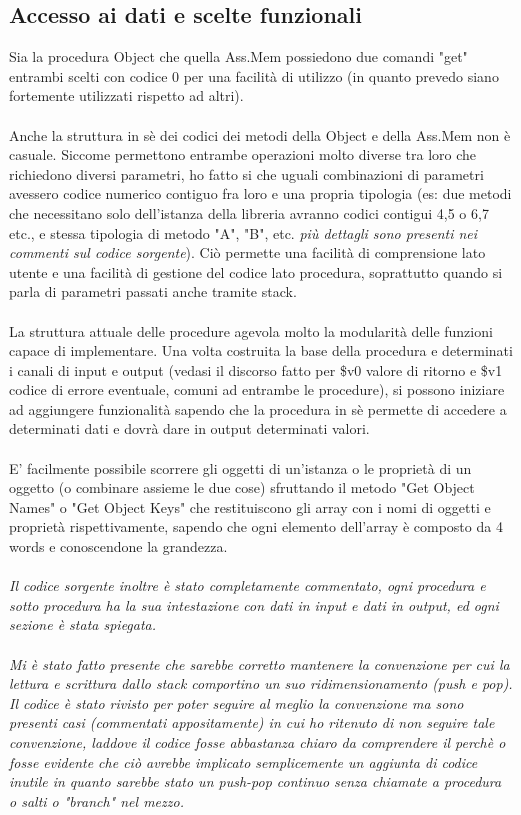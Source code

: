 \documentclass[a4paper]{article}
\begin{document}
\subsection{Accesso ai dati e scelte funzionali}
Sia la procedura Object che quella Ass.Mem possiedono due comandi "get" entrambi scelti con codice 0 per una facilità di utilizzo (in quanto prevedo siano fortemente utilizzati rispetto ad altri).
\\\\
Anche la struttura in sè dei codici dei metodi della Object e della Ass.Mem non è casuale. Siccome permettono entrambe operazioni molto diverse tra loro che richiedono diversi parametri, ho fatto si che uguali combinazioni di parametri avessero codice numerico contiguo fra loro e una propria tipologia (es: due metodi che necessitano solo dell'istanza della libreria avranno codici contigui 4,5 o 6,7 etc., e stessa tipologia di metodo "A", "B", etc. \textit{più dettagli sono presenti nei commenti sul codice sorgente}). Ciò permette una facilità di comprensione lato utente e una facilità di gestione del codice lato procedura, soprattutto quando si parla di parametri passati anche tramite stack.
\\\\
La struttura attuale delle procedure agevola molto la modularità delle funzioni capace di implementare. Una volta costruita la base della procedura e determinati i canali di input e output (vedasi il discorso fatto per \$v0 valore di ritorno e \$v1 codice di errore eventuale, comuni ad entrambe le procedure), si possono iniziare ad aggiungere funzionalità sapendo che la procedura in sè permette di accedere a determinati dati e dovrà dare in output determinati valori.
\\\\
E' facilmente possibile scorrere gli oggetti di un'istanza o le proprietà di un oggetto (o combinare assieme le due cose) sfruttando il metodo "Get Object Names" o "Get Object Keys" che restituiscono gli array con i nomi di oggetti e proprietà rispettivamente, sapendo che ogni elemento dell'array è composto da 4 words e conoscendone la grandezza.
\\\\
\textit{Il codice sorgente inoltre è stato completamente commentato, ogni procedura e sotto procedura ha la sua intestazione con dati in input e dati in output, ed ogni sezione è stata spiegata.}
\\\\
\textit{Mi è stato fatto presente che sarebbe corretto mantenere la convenzione per cui la lettura e scrittura dallo stack comportino un suo ridimensionamento (push e pop). Il codice è stato rivisto per poter seguire al meglio la convenzione ma sono presenti casi (commentati appositamente) in cui ho ritenuto di non seguire tale convenzione, laddove il codice fosse abbastanza chiaro da comprendere il perchè o fosse evidente che ciò avrebbe implicato semplicemente un aggiunta di codice inutile in quanto sarebbe stato un push-pop continuo senza chiamate a procedura o salti o "branch" nel mezzo.}
\end{document}

